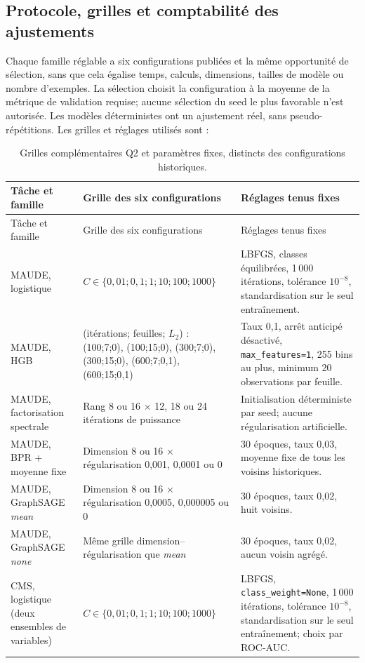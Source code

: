 \subsection{Protocole, grilles et comptabilité des ajustements}

Chaque famille réglable a six configurations publiées et la même opportunité de sélection, sans que cela égalise temps, calculs, dimensions, tailles de modèle ou nombre d'exemples. La sélection choisit la configuration à la moyenne de la métrique de validation requise; aucune sélection du seed le plus favorable n'est autorisée. Les modèles déterministes ont un ajustement réel, sans pseudo-répétitions. Les grilles et réglages utilisés sont :

\begin{longtable}{@{}p{26mm}p{68mm}p{48mm}@{}}
\caption{Grilles complémentaires Q2 et paramètres fixes, distincts des configurations historiques.}\label{tab:q2-grids}\\
\toprule
Tâche et famille & Grille des six configurations & Réglages tenus fixes\\
\midrule\endfirsthead
\toprule
Tâche et famille & Grille des six configurations & Réglages tenus fixes\\
\midrule\endhead
MAUDE, logistique & $C\in\{0{,}01;0{,}1;1;10;100;1000\}$ & LBFGS, classes équilibrées, 1\,000 itérations, tolérance $10^{-8}$, standardisation sur le seul entraînement.\\
MAUDE, HGB & (itérations; feuilles; $L_2$) : (100;7;0), (100;15;0), (300;7;0), (300;15;0), (600;7;0{,}1), (600;15;0{,}1) & Taux 0{,}1, arrêt anticipé désactivé, \texttt{max\_features=1}, 255 bins au plus, minimum 20 observations par feuille.\\
MAUDE, factorisation spectrale & Rang 8 ou 16 $\times$ 12, 18 ou 24 itérations de puissance & Initialisation déterministe par seed; aucune régularisation artificielle.\\
MAUDE, BPR + moyenne fixe & Dimension 8 ou 16 $\times$ régularisation 0{,}001, 0{,}0001 ou 0 & 30 époques, taux 0{,}03, moyenne fixe de tous les voisins historiques.\\
MAUDE, GraphSAGE \emph{mean} & Dimension 8 ou 16 $\times$ régularisation 0{,}0005, 0{,}000005 ou 0 & 30 époques, taux 0{,}02, huit voisins.\\
MAUDE, GraphSAGE \emph{none} & Même grille dimension--régularisation que \emph{mean} & 30 époques, taux 0{,}02, aucun voisin agrégé.\\
CMS, logistique (deux ensembles de variables) & $C\in\{0{,}01;0{,}1;1;10;100;1000\}$ & LBFGS, \texttt{class\_weight=None}, 1\,000 itérations, tolérance $10^{-8}$, standardisation sur le seul entraînement; choix par ROC-AUC.\\

\end{longtable}
